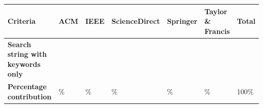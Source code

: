 \begin{table}
	{\begin{tabular}{p{4.8cm}p{1.7cm}p{1.7cm}p{1.7cm}p{1.7cm}p{2cm}p{1.4cm}} \toprule
			\textbf{Criteria}                         & \textbf{ACM} & \textbf{IEEE} & \textbf{ScienceDirect} & \textbf{Springer} & \textbf{Taylor \& Francis} & \textbf{Total} \\
			\midrule
			\textbf{Search string with keywords only} & \iacm{}      & \iieee{}      & \isd{}                 & \ispr{}           & \itf{}                     & \itot{}        \\
			\textbf{Percentage contribution}          & \iacmp{}\%   & \iieeep{}\%   & \isdp{}\%              & \isprp{}\%        & \itfp{}\%                  & 100\%          \\
			\bottomrule
		\end{tabular}}
	\label{table:search_results_exclusion}
\end{table}

